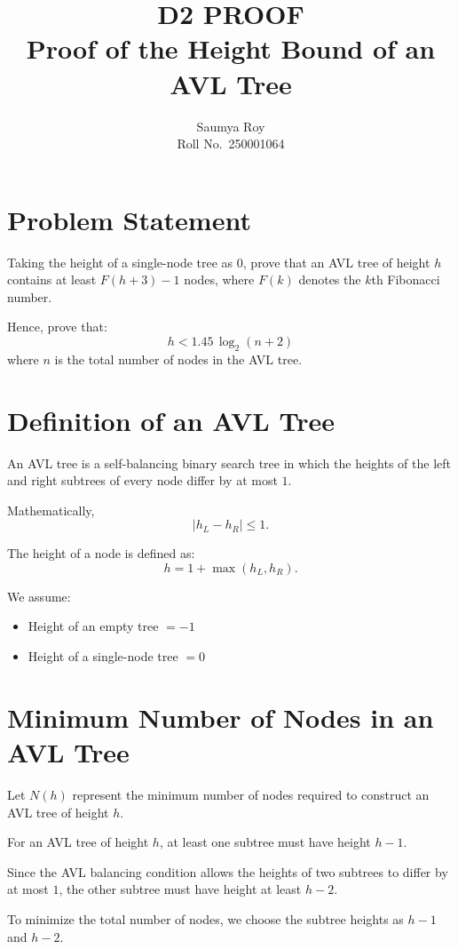 \documentclass[11pt,a4paper]{article}
\title{\textbf{D2 PROOF}\\[0.5em]\Large Proof of the Height Bound of an AVL Tree}
\author{Saumya Roy\\ Roll No.\ 250001064}
\date{}
\begin{document}
\maketitle

\section{Problem Statement}

Taking the height of a single-node tree as $0$, prove that an AVL tree of height $h$ contains at least $F(h+3)-1$ nodes, where $F(k)$ denotes the $k$th Fibonacci number.

Hence, prove that:
\[
  \boxed{h < 1.45\,\log_2(n+2)}
\]
where $n$ is the total number of nodes in the AVL tree.

\section{Definition of an AVL Tree}

An AVL tree is a self-balancing binary search tree in which the heights of the left and right subtrees of every node differ by at most $1$.

Mathematically,
\[
  |h_L - h_R| \le 1.
\]

The height of a node is defined as:
\[
  h = 1 + \max(h_L, h_R).
\]

We assume:
\begin{itemize}
  \item Height of an empty tree $= -1$
  \item Height of a single-node tree $= 0$
\end{itemize}

\section{Minimum Number of Nodes in an AVL Tree}

Let $N(h)$ represent the minimum number of nodes required to construct an AVL tree of height $h$.

For an AVL tree of height $h$, at least one subtree must have height $h-1$.

Since the AVL balancing condition allows the heights of two subtrees to differ by at most $1$, the other subtree must have height at least $h-2$.

To minimize the total number of nodes, we choose the subtree heights as $h-1$ and $h-2$.
\end{document}
